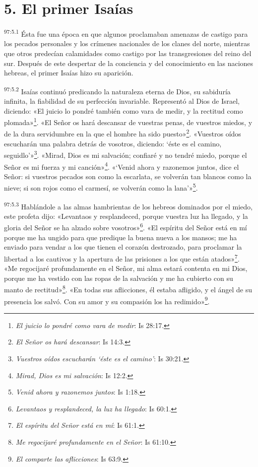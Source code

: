 \section*{5. El primer Isaías}
\par
\textsuperscript{97:5.1} Ésta fue una época en que algunos proclamaban amenazas de castigo para los pecados personales y los crímenes nacionales de los clanes del norte, mientras que otros predecían calamidades como castigo por las transgresiones del reino del sur. Después de este despertar de la conciencia y del conocimiento en las naciones hebreas, el primer Isaías hizo su aparición.

\par
\textsuperscript{97:5.2} Isaías continuó predicando la naturaleza eterna de Dios, su sabiduría infinita, la fiabilidad de su perfección invariable. Representó al Dios de Israel, diciendo: «El juicio lo pondré también como vara de medir, y la rectitud como plomada»\footnote{\textit{El juicio lo pondré como vara de medir}: Is 28:17.}. «El Señor os hará descansar de vuestras penas, de vuestros miedos, y de la dura servidumbre en la que el hombre ha sido puesto»\footnote{\textit{El Señor os hará descansar}: Is 14:3.}. «Vuestros oídos escucharán una palabra detrás de vosotros, diciendo: `éste es el camino, seguidlo'»\footnote{\textit{Vuestros oídos escucharán `éste es el camino'}: Is 30:21.}. «Mirad, Dios es mi salvación; confiaré y no tendré miedo, porque el Señor es mi fuerza y mi canción»\footnote{\textit{Mirad, Dios es mi salvación}: Is 12:2.}. «`Venid ahora y razonemos juntos, dice el Señor: si vuestros pecados son como la escarlata, se volverán tan blancos como la nieve; si son rojos como el carmesí, se volverán como la lana'»\footnote{\textit{Venid ahora y razonemos juntos}: Is 1:18.}.

\par
\textsuperscript{97:5.3} Hablándole a las almas hambrientas de los hebreos dominados por el miedo, este profeta dijo: «Levantaos y resplandeced, porque vuestra luz ha llegado, y la gloria del Señor se ha alzado sobre vosotros»\footnote{\textit{Levantaos y resplandeced, la luz ha llegado}: Is 60:1.}. «El espíritu del Señor está en mí porque me ha ungido para que predique la buena nueva a los mansos; me ha enviado para vendar a los que tienen el corazón destrozado, para proclamar la libertad a los cautivos y la apertura de las prisiones a los que están atados»\footnote{\textit{El espíritu del Señor está en mí}: Is 61:1.}. «Me regocijaré profundamente en el Señor, mi alma estará contenta en mi Dios, porque me ha vestido con las ropas de la salvación y me ha cubierto con su manto de rectitud»\footnote{\textit{Me regocijaré profundamente en el Señor}: Is 61:10.}. «En todas sus aflicciones, él estaba afligido, y el ángel de su presencia los salvó. Con su amor y su compasión los ha redimido»\footnote{\textit{El comparte las aflicciones}: Is 63:9.}.

